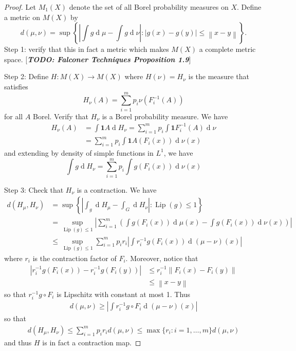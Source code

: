 \documentclass[11pt, a4paper]{memoir}
\newcommand{\norm}[1]{\ensuremath{\left\lVert#1\right\rVert}}
\theoremstyle{change}
\theoremstyle{plain}
\theoremstyle{nonumberplain}
\newtheorem{proof}{Proof}
\renewcommand{\d}[1]{\ensuremath{\operatorname{d}\!{#1}}}
\newcommand{\TODO}[1]{[\textit{\textbf{TODO: #1}}]}
\newcommand{\idc}{\mathbf{1}}
\DeclareMathOperator{\Lip}{Lip}
\numberwithin{equation}{section}
\begin{document}
\begin{proof}
    Let $M_1(X)$ denote the set of all Borel probability measures on $X$.
    Define a metric on $M(X)$ by
    \begin{equation*}
        d(\mu,\nu)=\sup\left\{\left|\int g\d{\mu}-\int g\d{\nu}\right|:|g(x)-g(y)|\leq\norm{x-y}\right\}.
    \end{equation*}
    Step 1: verify that this in fact a metric which makes $M(X)$ a complete metric space.
    \TODO{Falconer Techniques Proposition 1.9}

    Step 2: Define $H:M(X)\to M(X)$ where $H(\nu)=H_\nu$ is the measure that satisfies
    \begin{equation*}
        H_\nu(A)=\sum_{i=1}^m p_i\nu(F_i^{-1}(A))
    \end{equation*}
    for all $A$ Borel.
    Verify that $H_\nu$ is a Borel probability measure.
    We have
    \begin{align*}
        H_\nu(A) &= \int\idc{A}\d{H_\nu} = \sum_{i=1}^m p_i\int\idc{F_i^{-1}(A)}\d{\nu}\\
                 &= \sum_{i=1}^m p_i\int\idc{A}(F_i(x))\d{\nu(x)}
    \end{align*}
    and extending by density of simple functions in $L^1$, we have
    \begin{equation*}
        \int g\d{H_\nu}=\sum_{i=1}^m p_i\int g(F_i(x))\d{\nu(x)}
    \end{equation*}

    Step 3: Check that $H_\nu$ is a contraction.
    We have
    \begin{align*}
        d(H_\mu,H_\nu) &= \sup\left\{\left|\int_g\d{H_\mu}-\int_G\d{H_\nu}\right|:\Lip(g)\leq 1\right\}\\
                       &= \sup_{\Lip(g)\leq 1}\left|\sum_{i=1}^m\left(\int g(F_i(x))\d{\mu(x)}-\int g(F_i(x))\d{\nu(x)}\right)\right|\\
                       &\leq \sup_{\Lip(g)\leq 1}\sum_{i=1}^m p_ir_i\left|\int r_i^{-1}g(F_i(x))\d{(\mu-\nu)(x)}\right|
    \end{align*}
    where $r_i$ is the contraction factor of $F_i$.
    Moreover, notice that
    \begin{align*}
        \left|r_i^{-1}g(F_i(x))-r_i^{-1}g(F_i(y))\right| &\leq r_i^{-1}\norm{F_i(x)-F_i(y)}\\
                                                         &\leq \norm{x-y}
    \end{align*}
    so that $r_i^{-1}g\circ F_i$ is Lipschitz with constant at most 1.
    Thus
    \begin{align*}
        d(\mu,\nu)\geq\left|\int r_i^{-1}g\circ F_i\d{(\mu-\nu)(x)}\right|
    \end{align*}
    so that
    \begin{align*}
        d(H_\mu,H_\nu)\leq \sum_{i=1}^m p_ir_i d(\mu,\nu)\leq\max\{r_i:i=1,\ldots,m\}d(\mu,\nu)
    \end{align*}
    and thus $H$ is in fact a contraction map.


\end{proof}
\end{document}
